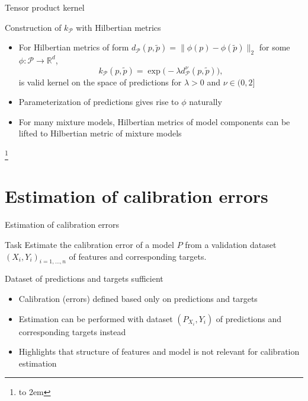 \documentclass[aspectratio=169,hyperref={pdfpagelabels=false,pageanchor=false,bookmarks=false}]{beamer}
\newcommand{\reffootnote}[1]{%
  \let\oldthefootnote=\thefootnote%
  \addtocounter{footnote}{-1}%
  \renewcommand{\thefootnote}{}%
  \footnote{\hspace{-2em}\hbox to 2em{\hfil\faBook\hspace{0.2em}}\fullcite{#1}}%
  \let\thefootnote=\oldthefootnote%
}
\begin{document}
\begin{frame}{Tensor product kernel}
  \begin{block}{Construction of $k_{\mathcal{P}}$ with Hilbertian metrics}
    \begin{itemize}[<+->]
      \item For Hilbertian metrics of form $d_{\mathcal{P}}(p, \tilde{p}) = \|\phi(p) - \phi(\tilde{p})\|_{2}$
            for some $\phi \colon \mathcal{P} \to \mathbb{R}^{d}$,
            \begin{equation}\label{eq:kp}
              k_{\mathcal{P}}(p, \tilde{p}) = \exp{\big( -\lambda d^{\nu}_{\mathcal{P}}(p, \tilde{p})\big)},
            \end{equation}
            is valid kernel on the space of predictions for $\lambda > 0$ and $\nu \in (0, 2]$
      \item Parameterization of predictions gives rise to $\phi$ naturally
      \item For many mixture models, Hilbertian metrics of model components can be lifted to Hilbertian metric of mixture models
    \end{itemize}
  \end{block}
  \reffootnote{Widmann2021}
\end{frame}

\section{Estimation of calibration errors}
\frame{\sectionpage}

\begin{frame}{Estimation of calibration errors}
  \begin{block}{Task}
    Estimate the calibration error of a model $P$ from a validation dataset
    $(X_{i}, Y_{i})_{i=1,\ldots,n}$ of features and corresponding targets.
  \end{block}
  \pause
  \begin{block}{Dataset of predictions and targets sufficient}
    \begin{itemize}
      \item Calibration (errors) defined based only on predictions and targets
      \item Estimation can be performed with dataset $(P_{X_{i}}, Y_{i})$ of predictions and corresponding targets instead
      \item Highlights that structure of features and model is not relevant for calibration estimation
    \end{itemize}
  \end{block}
\end{frame}
\end{document}
